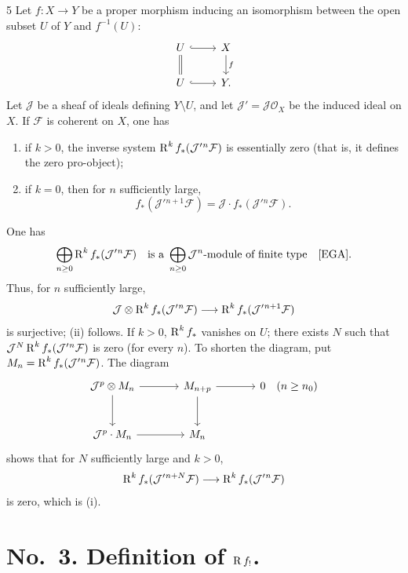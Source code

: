 \begin{bookproposition}{5}\label{appen:prop5}
Let $f:X\to Y$ be a proper morphism inducing an isomorphism
between the open subset $U$ of $Y$ and $f^{-1}(U)$:
\[
\begin{tikzcd}
U \ar[r,hook] \ar[d,equals] & X \ar[d,"f"] \\
U \ar[r,hook] & Y.
\end{tikzcd}
\]
Let $\mathcal J$ be a sheaf of ideals defining $Y\setminus U$,
and let $\mathcal J'=\mathcal J\mathcal O_X$ be the induced ideal on $X$.
If $\mathcal F$ is coherent on $X$, one has
\begin{enumerate}
\item[(i)] if $k>0$, the inverse system
$\operatorname{R}^k f_*(\mathcal J'{}^n\mathcal F)$ is essentially zero
(that is, it defines the zero pro-object);
\item[(ii)] if $k=0$, then for $n$ sufficiently large,
\[
f_*(\mathcal J'{}^{n+1}\mathcal F)
=\mathcal J\cdot f_*(\mathcal J'{}^n\mathcal F).
\]
\end{enumerate}
\end{bookproposition}

One has
\[
\bigoplus_{n\ge0}\RR^k f_*(\mathcal J'{}^n\mathcal F)
\quad\text{is a }\bigoplus_{n\ge0}\mathcal J^n\text{-module of finite type}
\quad\text{\cite[\nopp III]{EGA}}.
\]
Thus, for $n$ sufficiently large,
\[
\mathcal J\otimes\operatorname{R}^k f_*(\mathcal J'{}^n\mathcal F)
\longrightarrow\operatorname{R}^k f_*(\mathcal J'{}^{n+1}\mathcal F)
\]
is surjective; (ii) follows. If $k>0$, $\operatorname{R}^k f_*$ vanishes on $U$;
there exists $N$ such that $\mathcal J^N\operatorname{R}^k f_*(\mathcal J'{}^n\mathcal F)$
is zero (for every $n$).
To shorten the diagram, put $M_n=\operatorname{R}^k f_*(\mathcal J'{}^n\mathcal F)$.
The diagram
\[
\begin{tikzcd}[row sep=large,column sep=large]
\mathcal J^p\otimes M_n \ar[r] \ar[d]
 & M_{n+p} \ar[r] \ar[d] & 0\quad(n\ge n_0) \\
\mathcal J^p\cdot M_n \ar[r] & M_n
\end{tikzcd}
\]
shows that for $N$ sufficiently large and $k>0$,
\[
\operatorname{R}^k f_*(\mathcal J'{}^{n+N}\mathcal F)
\longrightarrow\operatorname{R}^k f_*(\mathcal J'{}^n\mathcal F)
\]
is zero, which is (i).

\section*{No.\ 3. Definition of $\operatorname{R} f_!$.}\label{appen:sec3}

